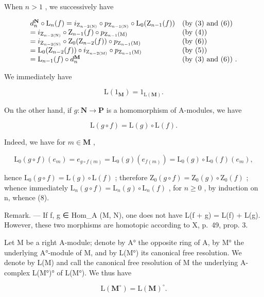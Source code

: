 When \(n > 1\) , we successively have

\[
\begin{array}{l l} d _ {n} ^ {\mathbf {N}} \circ \mathrm{L} _ {n} (f) = i _ {\mathrm{Z} _ {n - 2 (\mathrm{N})}} \circ p _ {\mathrm{Z} _ {n - 1 (\mathrm{N})}} \circ \mathrm{L} _ {0} (\mathrm{Z} _ {n - 1} (f)) & \text {(by (3) and (6))} \\ = i _ {\mathrm{Z} _ {n - 2 (\mathrm{N})}} \circ \mathrm{Z} _ {n - 1} (f) \circ p _ {\mathrm{Z} _ {n - 1} (\mathrm{M})} & \text {(by (4))} \\ = i _ {\mathrm{Z} _ {n - 2 (\mathrm{N})}} \circ \mathrm{Z} _ {0} (\mathrm{Z} _ {n - 2} (f)) \circ p _ {\mathrm{Z} _ {n - 1} (\mathrm{M})} & \text {(by (6))} \\ = \mathrm{L} _ {0} (\mathrm{Z} _ {n - 2} (f)) \circ i _ {\mathrm{Z} _ {n - 2 (\mathrm{M})}} \circ p _ {\mathrm{Z} _ {n - 1} (\mathrm{M})} & \text {(by (5))} \\ = \mathrm{L} _ {n - 1} (f) \circ d _ {n} ^ {\mathbf {M}} & \text {(by (3) and (6)) .} \end{array}
\]

We immediately have

\[
\mathrm{L} (1 _ {\mathbf {M}}) = 1 _ {\mathrm{L} (\mathbf {M})}.\tag{7}
\]

On the other hand, if \(g: \mathbf{N} \to \mathbf{P}\) is a homomorphism of A-modules, we have

\[
\mathrm{L} (g \circ f) = \mathrm{L} (g) \circ \mathrm{L} (f).\tag{8}
\]

Indeed, we have for \(m \in \mathbf{M}\) ,

\[
\mathrm{L} _ {0} (g \circ f) \left(e _ {m}\right) = e _ {g \circ f (m)} = \mathrm{L} _ {0} (g) \left(e _ {f (m)}\right) = \mathrm{L} _ {0} (g) \circ \mathrm{L} _ {0} (f) \left(e _ {m}\right),
\]

hence \(\mathrm{L}_{0}(g\circ f)=\mathrm{L}(g)\circ\mathrm{L}(f)\) ; therefore \(\mathrm{Z}_{0}(g\circ f)=\mathrm{Z}_{0}(g)\circ\mathrm{Z}_{0}(f)\) ; whence immediately \(\mathrm{L}_{n}(g\circ f)=\mathrm{L}_{n}(g)\circ\mathrm{L}_{n}(f)\) , for \(n\geqslant0\) , by induction on n, whence (8).

Remark. --- If f, g ∈ Hom\_A (M, N), one does not have L(f + g) = L(f) + L(g). However, these two morphisms are homotopic according to X, p.~49, prop. 3.

Let M be a right A-module; denote by A° the opposite ring of A, by M° the underlying A°-module of M, and by L(M°) its canonical free resolution. We denote by L(M) and call the canonical free resolution of M the underlying A-complex L(M°)° of L(M°). We thus have

\[
\mathrm{L} (\mathbf {M} ^ {\circ}) = \mathrm{L} (\mathbf {M}) ^ {\circ}.
\]
\relax{}
